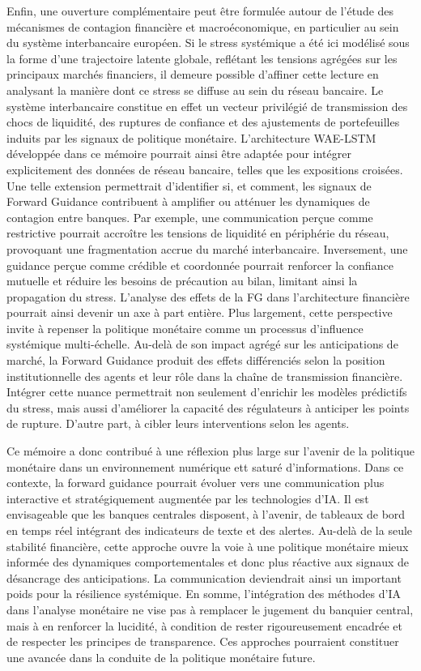 Enfin, une ouverture complémentaire peut être formulée autour de l’étude des mécanismes de contagion financière et macroéconomique, en particulier au sein du système interbancaire européen. Si le stress systémique a été ici modélisé sous la forme d’une trajectoire latente globale, reflétant les tensions agrégées sur les principaux marchés financiers, il demeure possible d’affiner cette lecture en analysant la manière dont ce stress se diffuse au sein du réseau bancaire. Le système interbancaire constitue en effet un vecteur privilégié de transmission des chocs de liquidité, des ruptures de confiance et des ajustements de portefeuilles induits par les signaux de politique monétaire. L’architecture WAE-LSTM développée dans ce mémoire pourrait ainsi être adaptée pour intégrer explicitement des données de réseau bancaire, telles que les expositions croisées. Une telle extension permettrait d’identifier si, et comment, les signaux de Forward Guidance contribuent à amplifier ou atténuer les dynamiques de contagion entre banques. Par exemple, une communication perçue comme restrictive pourrait accroître les tensions de liquidité en périphérie du réseau, provoquant une fragmentation accrue du marché interbancaire. Inversement, une guidance perçue comme crédible et coordonnée pourrait renforcer la confiance mutuelle et réduire les besoins de précaution au bilan, limitant ainsi la propagation du stress. L’analyse des effets de la FG dans l’architecture financière pourrait ainsi devenir un axe à part entière. Plus largement, cette perspective invite à repenser la politique monétaire comme un processus d’influence systémique multi-échelle. Au-delà de son impact agrégé sur les anticipations de marché, la Forward Guidance produit des effets différenciés selon la position institutionnelle des agents et leur rôle dans la chaîne de transmission financière. Intégrer cette nuance  permettrait non seulement d’enrichir les modèles prédictifs du stress, mais aussi d’améliorer la capacité des régulateurs à anticiper les points de rupture. D'autre part, à cibler leurs interventions selon les agents.

\newpage

Ce mémoire a donc contribué à une réflexion plus large sur l’avenir de la politique monétaire dans un environnement numérique ett saturé d’informations. Dans ce contexte, la forward guidance pourrait évoluer vers une communication plus interactive et stratégiquement augmentée par les technologies d’IA. Il est envisageable que les banques centrales disposent, à l’avenir, de tableaux de bord en temps réel intégrant des indicateurs de texte et des alertes. Au-delà de la seule stabilité financière, cette approche ouvre la voie à une politique monétaire mieux informée des dynamiques comportementales et donc plus réactive aux signaux de désancrage des anticipations. La communication deviendrait ainsi un important poids pour la résilience systémique. En somme, l’intégration des méthodes d’IA dans l’analyse monétaire ne vise pas à remplacer le jugement du banquier central, mais à en renforcer la lucidité, à condition de rester rigoureusement encadrée et de respecter les principes de transparence. Ces approches pourraient constituer une avancée dans la conduite de la politique monétaire future.